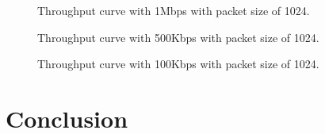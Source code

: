\documentclass[]{article}
\begin{document}
\begin{figure}
    
   \caption{Throughput curve with 1Mbps with packet size of 1024.\label{fig:tp_1}}
\end{figure}

\begin{figure}
    
   \caption{Throughput curve with 500Kbps with packet size of 1024.\label{fig:tp_500}}
\end{figure}

\begin{figure}
    
   \caption{Throughput curve with 100Kbps with packet size of 1024.\label{fig:tp_100}}
\end{figure}

\section{Conclusion}


\end{document}
